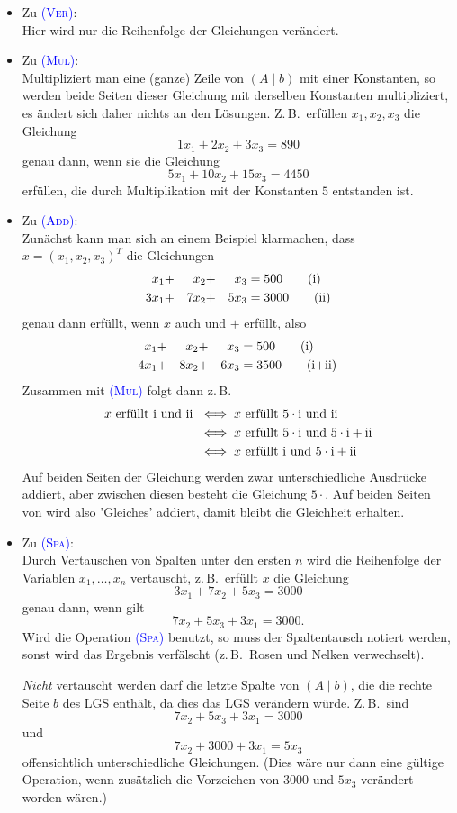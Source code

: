 \documentclass[a4paper,11pt,oneside]{article}
\theoremstyle{definition}
\def\RM#1{\uppercase\expandafter{\romannumeral #1\relax}}
\def\OP#1{\textcolor{blue}{(\textnormal{\textrm{\textsc{#1}})}}}
\begin{document}
\begin{itemize}
\item
Zu \OP{Ver}:~\\
Hier wird nur die Reihenfolge der Gleichungen verändert.
\item
Zu \OP{Mul}:~\\
Multipliziert man eine (ganze) Zeile von $ (A\mid b)$ mit einer Konstanten, so werden beide Seiten dieser Gleichung mit derselben Konstanten multipliziert, es ändert sich daher nichts an den Lösungen. Z.\,B.\ erfüllen $x_1,x_2,x_3$ die Gleichung
$$
1x_1+2x_2+3x_3=890
$$
genau dann, wenn sie die Gleichung
$$
5x_1+10x_2+15x_3=4450
$$
erfüllen, die durch Multiplikation mit der Konstanten  $5$   entstanden ist.
\item
Zu \OP{Add}:~\\
Zunächst kann man sich an einem Beispiel klarmachen, dass $x=(x_1,x_2,x_3)^T$ die Gleichungen
\begin{alignat}{3}
x_1&+&x_2&+&x_3&=500 \tag{\RM{1}}\\
3x_1&+&7x_2&+&5x_3&=3000 \tag{\RM{2}}
\end{alignat}
genau dann erfüllt, wenn $x$ auch \RM{1} und \RM{1}$+$\RM{2} erfüllt, also
\begin{alignat}{3}
x_1&+&x_2&+&x_3&=500 \tag{\RM{1}}\\
4x_1&+&8x_2&+&6x_3&=3500 \tag{\RM{1}+\RM{2}}
\end{alignat}
Zusammen mit \OP{Mul} folgt dann z.\,B.
\begin{alignat*}{1}
x \mbox{ erfüllt \RM{1} und \RM{2} }
&\iff
x\mbox{ erfüllt } 5\cdot\mbox{\RM{1}  und \RM{2}}\\
&\iff
x\mbox{ erfüllt } 5\cdot\mbox{\RM{1}  und }5\cdot
\mbox{\RM{1}}+\mbox{\RM{2}}\\
&\iff
x\mbox{ erfüllt \RM{1} und }5\cdot
\mbox{\RM{1}}+\mbox{\RM{2}}
\end{alignat*}
Auf beiden Seiten der Gleichung \RM{2} werden zwar unterschiedliche Ausdrücke addiert, aber zwischen diesen besteht die Gleichung $5\cdot$\RM{1}. Auf beiden Seiten von \RM{2} wird also 'Gleiches' addiert, damit bleibt die Gleichheit erhalten.
\item
Zu \OP{Spa}:~\\
Durch Vertauschen von Spalten unter den ersten $n$ wird die Reihenfolge der Variablen $x_1,\ldots,x_n$ vertauscht, z.\,B.\ erfüllt $x$ die Gleichung
$$
3 x_1+7 x_2+5 x_3=3000
$$
genau dann, wenn gilt
$$
7 x_2+5 x_3+3 x_1=3000.
$$
Wird die Operation \OP{Spa} benutzt, so muss der Spaltentausch notiert werden, sonst wird das Ergebnis verfälscht (z.\,B.\ Rosen und Nelken verwechselt).

\emph{Nicht} vertauscht werden darf die letzte Spalte von $( A\mid b)$, die die rechte Seite $b$ des LGS enthält, da dies das LGS verändern würde. Z.\,B.\ sind
$$
7 x_2+5 x_3+3 x_1=3000
$$
und
$$
7 x_2+3000+3 x_1=5x_3
$$
offensichtlich unterschiedliche Gleichungen. (Dies wäre nur dann eine gültige Operation, wenn zusätzlich die Vorzeichen von $3000$ und $5x_3$ verändert worden wären.)
\end{itemize}
\end{document}
